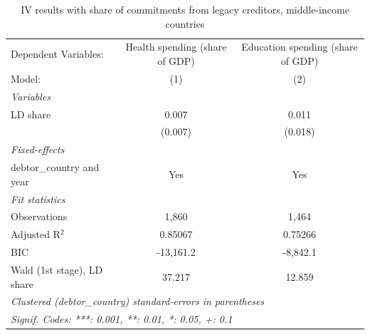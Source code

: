 
\begin{table}[htbp]
   \caption{\label{tab:iv_commit_other} IV results with share of commitments from legacy creditors, middle-income countries}
   \centering
   \begin{tabular}{lcc}
      \tabularnewline \midrule \midrule
      Dependent Variables:       & Health spending (share of GDP) & Education spending (share of GDP)\\  
      Model:                     & (1)                            & (2)\\  
      \midrule
      \emph{Variables}\\
      LD share                   & 0.007                          & 0.011\\   
                                 & (0.007)                        & (0.018)\\   
      \midrule
      \emph{Fixed-effects}\\
      debtor\_country and year   & Yes                            & Yes\\  
      \midrule
      \emph{Fit statistics}\\
      Observations               & 1,860                          & 1,464\\  
      Adjusted R$^2$             & 0.85067                        & 0.75266\\  
      BIC                        & -13,161.2                      & -8,842.1\\  
      Wald (1st stage), LD share & 37.217                         & 12.859\\  
      \midrule \midrule
      \multicolumn{3}{l}{\emph{Clustered (debtor\_country) standard-errors in parentheses}}\\
      \multicolumn{3}{l}{\emph{Signif. Codes: ***: 0.001, **: 0.01, *: 0.05, +: 0.1}}\\
   \end{tabular}
\end{table}


